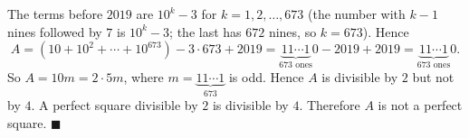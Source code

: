 The terms before $2019$ are $10^k-3$ for $k=1,2,\dots,673$ (the number with $k-1$ nines followed by $7$ is $10^k-3$; the last has $672$ nines, so $k=673$). Hence
\[
A=(10+10^2+\cdots+10^{673})-3\cdot673+2019=\underbrace{11\cdots1}_{673\text{ ones}}0-2019+2019=\underbrace{11\cdots1}_{673\text{ ones}}0 .
\]
So $A=10m=2\cdot5m$, where $m=\underbrace{11\cdots1}_{673}$ is odd. Hence $A$ is divisible by $2$ but not by $4$. A perfect square divisible by $2$ is divisible by $4$. Therefore $A$ is not a perfect square. $\blacksquare$
